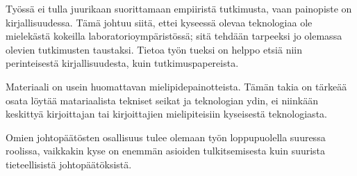 \documentclass[finnish,12pt,a4paper,pdftex,elec,utf8]{aaltothesis}
\begin{document}
Työssä ei tulla juurikaan suorittamaan empiiristä tutkimusta, vaan painopiste on kirjallisuudessa.
Tämä johtuu siitä, ettei kyseessä olevaa teknologiaa ole mielekästä kokeilla laboratorioympäristössä; sitä tehdään tarpeeksi jo olemassa olevien tutkimusten taustaksi.
Tietoa työn tueksi on helppo etsiä niin perinteisestä kirjallisuudesta, kuin tutkimuspapereista.

Materiaali on usein huomattavan mielipidepainotteista.
Tämän takia on tärkeää osata löytää matariaalista tekniset seikat ja teknologian ydin, ei niinkään keskittyä kirjoittajan tai kirjoittajien mielipiteisiin kyseisestä teknologiasta.

Omien johtopäätösten osallisuus tulee olemaan työn loppupuolella suuressa roolissa, vaikkakin kyse on enemmän asioiden tulkitsemisesta kuin suurista tieteellisistä johtopäätöksistä.

\newpage
\end{document}
